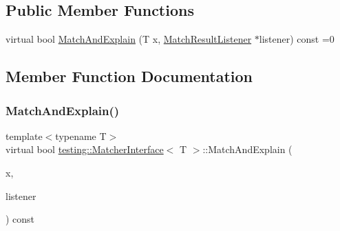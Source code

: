 \subsection*{Public Member Functions}
\begin{DoxyCompactItemize}
\item 
virtual bool \hyperlink{classtesting_1_1_matcher_interface_a296b43607cd99d60365f0e6a762777cf}{Match\+And\+Explain} (T x, \hyperlink{classtesting_1_1_match_result_listener}{Match\+Result\+Listener} $\ast$listener) const =0
\end{DoxyCompactItemize}


\subsection{Member Function Documentation}
\mbox{\label{classtesting_1_1_matcher_interface_a296b43607cd99d60365f0e6a762777cf}} 
\subsubsection{\texorpdfstring{Match\+And\+Explain()}{MatchAndExplain()}}
{\footnotesize\ttfamily template$<$typename T$>$ \\
virtual bool \hyperlink{classtesting_1_1_matcher_interface}{testing\+::\+Matcher\+Interface}$<$ T $>$\+::Match\+And\+Explain (\begin{DoxyParamCaption}\item[{T}]{x,  }\item[{\hyperlink{classtesting_1_1_match_result_listener}{Match\+Result\+Listener} $\ast$}]{listener }\end{DoxyParamCaption}) const\hspace{0.3cm}{\ttfamily [pure virtual]}}



